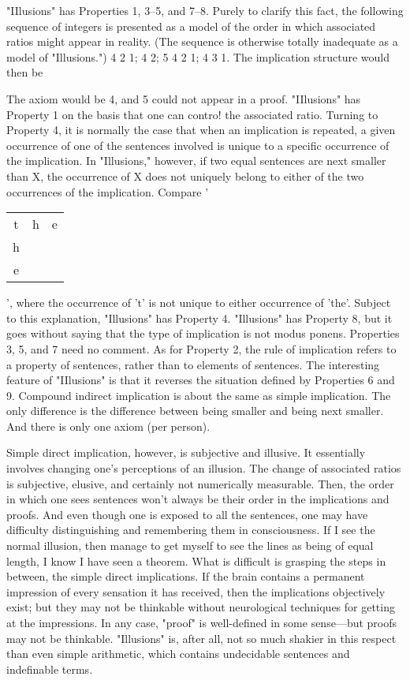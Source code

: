 \documentclass[10pt,twoside,draft]{memoir}
\begin{document}
{

"IIlusions" has Properties 1, 3--5, and 7--8. Purely to clarify this fact, the 
following sequence of integers is presented as a model of the order in which 
associated ratios might appear in reality. (The sequence is otherwise totally 
inadequate as a model of "Illusions.") 4 2 1; 4 2; 5 4 2 1; 4 3 1. The 
implication structure would then be 


The axiom would be 4, and 5 could not appear in a proof. "IIlusions" has 
Property 1 on the basis that one can contro! the associated ratio. Turning to 
Property 4, it is normally the case that when an implication is repeated, a 
given occurrence of one of the sentences involved is unique to a specific 
occurrence of the implication. In "Illusions," however, if two equal 
sentences are next smaller than X, the occurrence of X does not uniquely 
	belong to either of the two occurrences of the implication. Compare '\begin{tabular}{c c c} t & h & e \\ h &   &   \\ e &   & \end{tabular}', 
where the occurrence of 't' is not unique to either occurrence of 'the'. 
Subject to this explanation, "Illusions" has Property 4. "Illusions" has 
Property 8, but it goes without saying that the type of implication is not 
modus ponens. Properties 3, 5, and 7 need no comment. As for Property 2, 
the rule of implication refers to a property of sentences, rather than to 
elements of sentences. The interesting feature of "IIlusions" is that it 
reverses the situation defined by Properties 6 and 9. Compound indirect 
implication is about the same as simple implication. The only difference is 
the difference between being smaller and being next smaller. And there is 
only one axiom (per person). 

Simple direct implication, however, is subjective and illusive. It 
essentially involves changing one's perceptions of an illusion. The change of 
associated ratios is subjective, elusive, and certainly not numerically 
measurable. Then, the order in which one sees sentences won't always be 
their order in the implications and proofs. And even though one is exposed 
to all the sentences, one may have difficulty distinguishing and remembering 
them in consciousness. If I see the normal illusion, then manage to get 
myself to see the lines as being of equal length, I know I have seen a 
theorem. What is difficult is grasping the steps in between, the simple direct 
implications. If the brain contains a permanent impression of every sensation 
it has received, then the implications objectively exist; but they may not be 
thinkable without neurological techniques for getting at the impressions. In 
any case, "proof" is well-defined in some sense---but proofs may not be 
thinkable. "Illusions" is, after all, not so much shakier in this respect than 
even simple arithmetic, which contains undecidable sentences and 
indefinable terms. 

}
\end{document}
